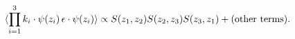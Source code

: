 \begin{equation}
\langle  \prod_{i=1}^3  k_i\cdot \psi(z_i) \,
\epsilon\cdot\psi(z_i) \rangle \propto
S(z_1,z_2)S(z_2,z_3)S(z_3,z_1) + \hbox{(other terms)}.
\end{equation}

